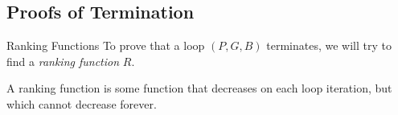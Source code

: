 \documentclass[xcolor=pdftex,t,11pt]{beamer}
\begin{document}
\subsection{Proofs of Termination}

\begin{frame}[fragile]{Ranking Functions}
 To prove that a loop $(P, G, B)$ terminates, we will try to find a \emph{ranking function} $R$.
 
 \vspace{1em}
 
 A ranking function is some function that decreases on each loop iteration, but which cannot decrease forever.
 
%  
\end{frame}
\end{document}
